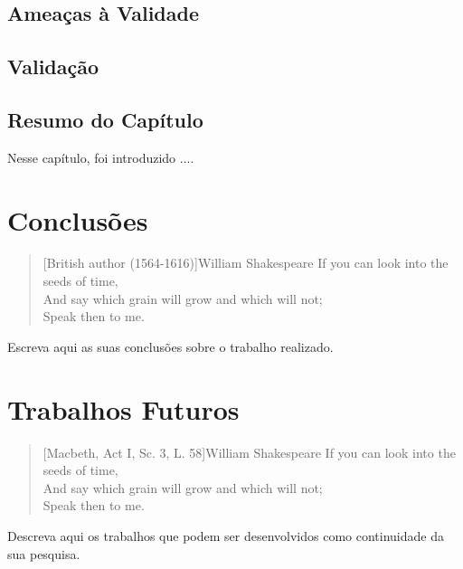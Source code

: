 \documentclass[final]{rc-book-2.14}
\begin{document}
\section{Ameaças à Validade}
\label{sec:experiments:threats-to-validity}


\section{Validação}
\label{sec:experiments:validation}


\section{Resumo do Capítulo}
\label{sec:experiments:summary}

Nesse capítulo, foi introduzido .... 

    
\chapter{Conclusões}
\label{chp:conclusions}

\begin{quotation}[British author (1564-1616)]{William Shakespeare}
If you can look into the seeds of time, \\
And say which grain will grow and which will not; \\
Speak then to me.
\end{quotation}

\drop Escreva aqui as suas conclusões sobre o trabalho realizado.


\chapter{Trabalhos Futuros}
\label{chp:future-work}

\begin{quotation}[Macbeth, Act I, Sc. 3, L. 58]{William Shakespeare}
If you can look into the seeds of time, \\
And say which grain will grow and which will not; \\
Speak then to me.
\end{quotation}

\drop Descreva aqui os trabalhos que podem ser desenvolvidos como continuidade da sua pesquisa. 


\backmatter

	

\end{document}
